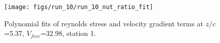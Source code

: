 \begin{figure}[H]
\centering
\texttt{[image: figs/run\_10/run\_10\_nut\_ratio\_fit]}
\caption{Polynomial fits of reynolds stress and velocity gradient terms at $z/c$=5.37, $V_{free}$=32.98, station 1.}
\label{fig:run_10_nut_ratio_fit}
\end{figure}


